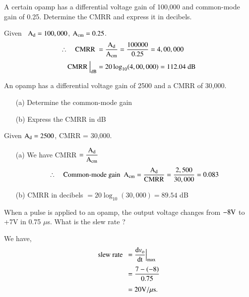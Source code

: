 \begin{problem}\label{prob4.6}
A certain opamp has a differential voltage gain of 100,000 and common-mode gain of 0.25. Determine the CMRR and express it in decibels.
\end{problem}

\begin{solution}
Given~ $\textrm{A}_{\text{d}}=100,000$, $\textrm{A}_{\text{cm}}=0.25$.
\begin{align*}
\therefore\quad \text{CMRR~} &= \frac{\textrm{A}_{\text{d}}}{\textrm{A}_{\text{cm}}}=\frac{100000}{0.25}=4,00,000\\[2pt]
\text{CMRR~}\Big|_{\text{dB}} &= 20 \log_{10}(4,00,000)=112.04\text{~dB}
\end{align*}
\end{solution}

\begin{problem}\label{prob4.7}
An opamp has a differential voltage gain of 2500 and a CMRR of 30,000.
\begin{itemize}
\item[(a)] Determine the common-mode gain

\item[(b)] Express the CMRR in dB
\end{itemize}
\end{problem}

\begin{solution}
Given $\textrm{A}_{\text{d}}=2500$, CMRR = 30,000.
\begin{itemize}
\item[(a)] We have CMRR $=\dfrac{\textrm{A}_{\text{d}}}{\textrm{A}_{\text{cm}}}$
$$
\therefore\quad \text{Common-mode gain~~} \textrm{A}_{\text{cm}}=\frac{\textrm{A}_{\text{d}}}{\text{CMRR}}=\frac{2,500}{30,000}=0.083
$$

\item[(b)] CMRR in decibels $=20\log_{10}(30,000)=89.54$ dB
\end{itemize}
\end{solution}

\vfill\eject

\begin{problem}\label{prob4.8}
When a pulse is applied to an opamp, the output voltage changes from $-8\textrm{V}$ to +7V in 0.75 $\mu$s. What is the slew rate ?
\end{problem}

\begin{solution}
We have,
\begin{align*}
\text{slew rate~~} &= \frac{\text{d}v_{\textrm{o}}}{\text{dt}}\Big|_{\max}\\[3pt]
&= \frac{7-(-8)}{0.75}\\[3pt]
&= 20\textrm{V}/\mu\text{s}.
\end{align*}
\end{solution}

